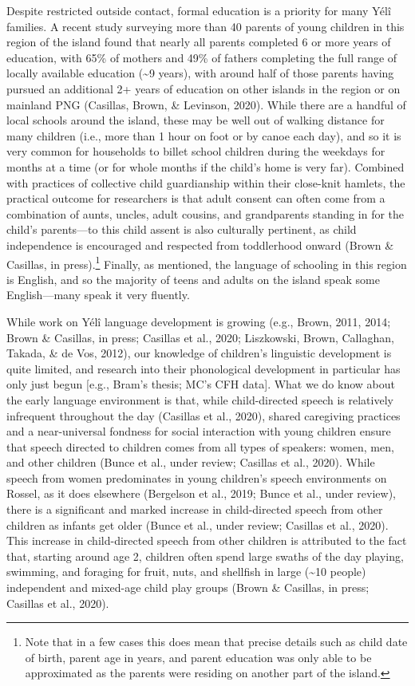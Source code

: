 \documentclass[english,,man,floatsintext]{apa6}
\begin{document}
Despite restricted outside contact, formal education is a priority for
many Yélî families. A recent study surveying more than 40 parents of
young children in this region of the island found that nearly all
parents completed 6 or more years of education, with 65\% of mothers and
49\% of fathers completing the full range of locally available education
(\textasciitilde{}9 years), with around half of those parents having
pursued an additional 2+ years of education on other islands in the
region or on mainland PNG (Casillas, Brown, \& Levinson, 2020). While
there are a handful of local schools around the island, these may be
well out of walking distance for many children (i.e., more than 1 hour
on foot or by canoe each day), and so it is very common for households
to billet school children during the weekdays for months at a time (or
for whole months if the child's home is very far). Combined with
practices of collective child guardianship within their close-knit
hamlets, the practical outcome for researchers is that adult consent can
often come from a combination of aunts, uncles, adult cousins, and
grandparents standing in for the child's parents---to this child assent
is also culturally pertinent, as child independence is encouraged and
respected from toddlerhood onward (Brown \& Casillas, in
press).\footnote{Note that in a few cases this does mean that precise
  details such as child date of birth, parent age in years, and parent
  education was only able to be approximated as the parents were
  residing on another part of the island.} Finally, as mentioned, the
language of schooling in this region is English, and so the majority of
teens and adults on the island speak some English---many speak it very
fluently.

While work on Yélî language development is growing (e.g., Brown, 2011,
2014; Brown \& Casillas, in press; Casillas et al., 2020; Liszkowski,
Brown, Callaghan, Takada, \& de Vos, 2012), our knowledge of children's
linguistic development is quite limited, and research into their
phonological development in particular has only just begun {[}e.g.,
Bram's thesis; MC's CFH data{]}. What we do know about the early
language environment is that, while child-directed speech is relatively
infrequent throughout the day (Casillas et al., 2020), shared caregiving
practices and a near-universal fondness for social interaction with
young children ensure that speech directed to children comes from all
types of speakers: women, men, and other children (Bunce et al., under
review; Casillas et al., 2020). While speech from women predominates in
young children's speech environments on Rossel, as it does elsewhere
(Bergelson et al., 2019; Bunce et al., under review), there is a
significant and marked increase in child-directed speech from other
children as infants get older (Bunce et al., under review; Casillas et
al., 2020). This increase in child-directed speech from other children
is attributed to the fact that, starting around age 2, children often
spend large swaths of the day playing, swimming, and foraging for fruit,
nuts, and shellfish in large (\textasciitilde{}10 people) independent
and mixed-age child play groups (Brown \& Casillas, in press; Casillas
et al., 2020).
\end{document}
